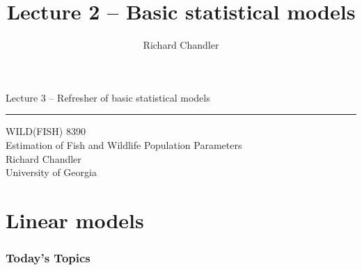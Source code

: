 \documentclass[color=usenames,dvipsnames]{beamer}\usepackage[]{graphicx}\usepackage[]{color}
\title{Lecture 2 -- Basic statistical models}
\author{Richard Chandler}
\begin{document}



\begin{frame}[plain]
  \LARGE
  \centering
  {\huge Lecture 3 -- Refresher of basic statistical models} \\
  {\color{default} \rule{\textwidth}{0.1pt}}
  \vfill
  \large
  WILD(FISH) 8390 \\
  Estimation of Fish and Wildlife Population Parameters \\
  \vfill
  \large
  Richard Chandler \\
  University of Georgia \\
\end{frame}




\section{Linear models}


\begin{frame}[plain]
  \frametitle{Today's Topics}
  \Large
\end{frame}












\end{document}
